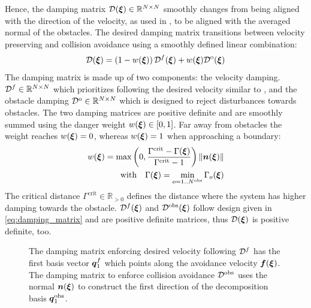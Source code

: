 Hence, the damping matrix $\mathcal{D}(\boldsymbol{\xi}) \in \mathbb{R}^{N \times N}$ smoothly changes from being aligned with the direction of the velocity, as used in \parencite{kronander2015passive}, to be aligned with the averaged normal of the obstacles. The desired damping matrix transitions between velocity preserving and collision avoidance using a smoothly defined linear combination:
\begin{equation}
    \matd D(\vecs\xi) = \left(1 - w(\vecs\xi) \right) {\matd D^{f}}(\vecs\xi) + w(\vecs\xi)  {\matd D^{\mathrm{o}}}(\vecs\xi) \label{eq:damping_summation}
\end{equation}
The damping matrix is made up of two components: the velocity damping. $\mathcal{D}^f \in \mathbb{R}^{N \times N}$ which prioritizes following the desired velocity similar to \parencite{kronander2015passive}, and the obstacle damping $\mathcal{D}^{\mathrm{o}} \in \mathbb{R}^{N \times N}$ which is designed to reject disturbances towards obstacles. The two damping matrices are positive definite and are smoothly summed using the danger weight $w(\boldsymbol{\xi}) \in [0, 1]$. Far away from obstacles the weight reaches $w(\boldsymbol{\xi}) = 0$, whereas $w(\boldsymbol{\xi}) = 1$ when approaching a boundary:
\begin{equation}
  \begin{split}
w(\vecs\xi) =
\max \left(0,  \frac{\Gamma^{\mathrm{crit}} - \Gamma(\vecs\xi)}{\Gamma^{\mathrm{crit}} - 1} \right) \| \vecs n(\vecs \xi) \| \\
\text{with} \quad
\Gamma(\vecs\xi) = \min_{o = 1..N^{\mathrm{obs}}} \Gamma_o(\vecs\xi)
\end{split}
\label{eq:weight_function}
\end{equation}
The critical distance $\Gamma^{\mathrm{crit}} \in \mathbb{R}_{>0}$ defines the distance where the system has higher damping towards the obstacle.
${\mathcal{D}^f}(\boldsymbol{\xi})$ and $\mathcal{D^{\mathrm{obs}}}(\boldsymbol{\xi})$ follow design given in \eqref{eq:damping_matrix} and are positive definite matrices, thus $\mathcal{D}(\boldsymbol{\xi})$ is positive definite, too.

\begin{figure}
  \center
  
\caption{The damping matrix enforcing desired velocity following $\mathcal{D}^{f}$ has the first basis vector $\boldsymbol{q}_1^{f}$ which points along the avoidance velocity $\boldsymbol{f}(\boldsymbol{\xi})$. The damping matrix to enforce collision avoidance $\mathcal{D}^{\mathrm{obs}}$ uses the normal $\boldsymbol{n}(\boldsymbol{\xi})$ to construct the first direction of the decomposition basis $\boldsymbol{q}^{\mathrm{obs}}_1$.}
\label{fig:damping_basis_construction}
\end{figure}

